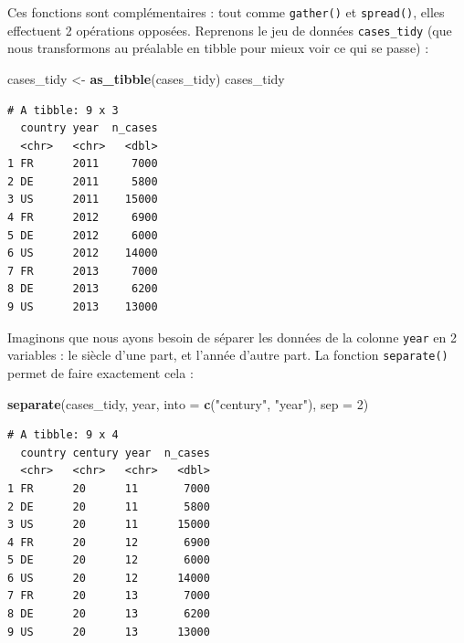 \documentclass[a4paperpaper,]{article}
\newenvironment{Shaded}{\begin{snugshade}}{\end{snugshade}}
\newcommand{\DataTypeTok}[1]{\textcolor[rgb]{0.00,0.34,0.68}{#1}}
\newcommand{\DecValTok}[1]{\textcolor[rgb]{0.69,0.50,0.00}{#1}}
\newcommand{\KeywordTok}[1]{\textcolor[rgb]{0.12,0.11,0.11}{\textbf{#1}}}
\newcommand{\NormalTok}[1]{\textcolor[rgb]{0.12,0.11,0.11}{#1}}
\newcommand{\StringTok}[1]{\textcolor[rgb]{0.75,0.01,0.01}{#1}}
\begin{document}
Ces fonctions sont complémentaires : tout comme \texttt{gather()} et \texttt{spread()}, elles effectuent 2 opérations opposées. Reprenons le jeu de données \texttt{cases\_tidy} (que nous transformons au préalable en tibble pour mieux voir ce qui se passe) :

\begin{Shaded}
\begin{Highlighting}[]
\NormalTok{cases_tidy <-}\StringTok{ }\KeywordTok{as_tibble}\NormalTok{(cases_tidy)}
\NormalTok{cases_tidy}
\end{Highlighting}
\end{Shaded}

\begin{verbatim}
# A tibble: 9 x 3
  country year  n_cases
  <chr>   <chr>   <dbl>
1 FR      2011     7000
2 DE      2011     5800
3 US      2011    15000
4 FR      2012     6900
5 DE      2012     6000
6 US      2012    14000
7 FR      2013     7000
8 DE      2013     6200
9 US      2013    13000
\end{verbatim}

Imaginons que nous ayons besoin de séparer les données de la colonne \texttt{year} en 2 variables : le siècle d'une part, et l'année d'autre part. La fonction \texttt{separate()} permet de faire exactement cela :

\begin{Shaded}
\begin{Highlighting}[]
\KeywordTok{separate}\NormalTok{(cases_tidy, year, }\DataTypeTok{into =} \KeywordTok{c}\NormalTok{(}\StringTok{"century"}\NormalTok{, }\StringTok{"year"}\NormalTok{), }\DataTypeTok{sep =} \DecValTok{2}\NormalTok{)}
\end{Highlighting}
\end{Shaded}

\begin{verbatim}
# A tibble: 9 x 4
  country century year  n_cases
  <chr>   <chr>   <chr>   <dbl>
1 FR      20      11       7000
2 DE      20      11       5800
3 US      20      11      15000
4 FR      20      12       6900
5 DE      20      12       6000
6 US      20      12      14000
7 FR      20      13       7000
8 DE      20      13       6200
9 US      20      13      13000
\end{verbatim}
\end{document}
